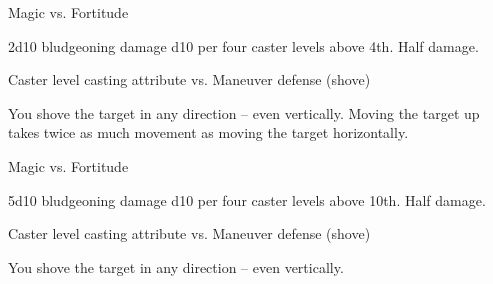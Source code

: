 \begin{spellheader}
    \spellrng{\rngmed}
\end{spellheader}
\begin{spelleffects}
    \begin{spellattack}{Magic vs. Fortitude}
        \begin{spellmargin}
            \spellsuccess 2d10 bludgeoning damage \add d10 per four caster levels above 4th.
            \spellfailure Half damage.
        \end{spellmargin}
        \spellatk Caster level \add casting attribute vs. Maneuver defense (shove)
        \begin{spellmargin}
            \spellsuccess You shove the target in any direction -- even vertically. Moving the target up takes twice as much movement as moving the target horizontally.
        \end{spellmargin}
    \end{spellattack}
\end{spelleffects}
\begin{spellfooter}

\end{spellfooter}

\begin{spellheader}
    \spellrng{\rngmed}
\end{spellheader}
\begin{spelleffects}
    \begin{spellattack}{Magic vs. Fortitude}
        \begin{spellmargin}
            \spellsuccess 5d10 bludgeoning damage \add d10 per four caster levels above 10th.
            \spellfailure Half damage.
        \end{spellmargin}
        \spellatk Caster level \add casting attribute  vs. Maneuver defense (shove)
        \begin{spellmargin}
            \spellsuccess You shove the target in any direction -- even vertically.
        \end{spellmargin}
    \end{spellattack}
\end{spelleffects}
\begin{spellfooter}

\end{spellfooter}

